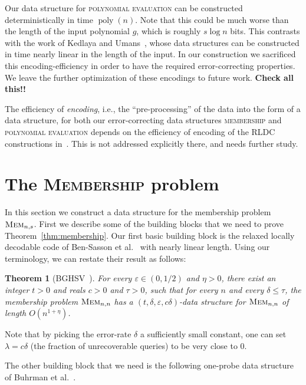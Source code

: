 \documentclass[11pt,english]{article}
\newcommand{\noun}[1]{\textsc{#1}}
\newtheorem{theorem}{Theorem}
\theoremstyle{definition}
\theoremstyle{remark}
\newcommand{\eps}{\varepsilon}
\newcommand{\polyn}{\operatorname{poly}}
\newcommand{\mem}{\mbox{\textsc{Mem}}}
\begin{document}
Our data structure for \noun{polynomial evaluation} can be constructed deterministically in time $\polyn(n)$. 
Note that this could be much worse than the length of the input polynomial $g$, which is roughly $s\log n$ bits.
This contrasts with the work of Kedlaya and Umans~\cite{kedl-umans}, whose data structures can be constructed 
in time nearly linear in the length of the input.  In our construction we sacrificed this encoding-efficiency
in order to have the required error-correcting properties.
We leave the further optimization of these encodings to future work.
{\bf Check all this!!}
\fi



The efficiency of \emph{encoding}, i.e., the ``pre-processing'' of the data into the form of a data structure, for both our error-correcting data structures  \noun{membership} and \noun{polynomial evaluation} depends on the efficiency of encoding of the RLDC constructions in~\cite{bghsv04}.  This is not addressed explicitly there, and needs further study. 


\section{The \noun{Membership} problem\label{sec:Membership problem}}

In this section we construct a data structure for the membership problem
$\mem_{n,s}$. First we describe some of the building blocks that
we need to prove Theorem~\ref{thm:membership}. Our first basic building
block is the relaxed locally decodable code of Ben-Sasson et al.~\cite{bghsv04}
with nearly linear length. Using our terminology, we can restate their
result as follows:

\begin{theorem}[BGHSV~\cite{bghsv04}]\label{thm:bghsv}For every
$\eps\in(0,1/2)$ and $\eta>0$, there exist an integer $t>0$
and reals $c>0$ and $\tau>0$, such that for every $n$
and every $\delta\leq\tau$, the membership problem $\mem_{n,n}$
has a $(t,\delta,\eps,c\delta)$-data structure for $\mem_{n,n}$
of length $O(n^{1+\eta})$. \end{theorem}

Note that by picking the error-rate $\delta$ a sufficiently small
constant, one can set $\lambda=c\delta$ (the fraction of unrecoverable queries) to be very close to $0$.

The other building block that we need is the following one-probe data
structure of Buhrman et al.~\cite{bmrv:bitvectorsj}.
\end{document}
